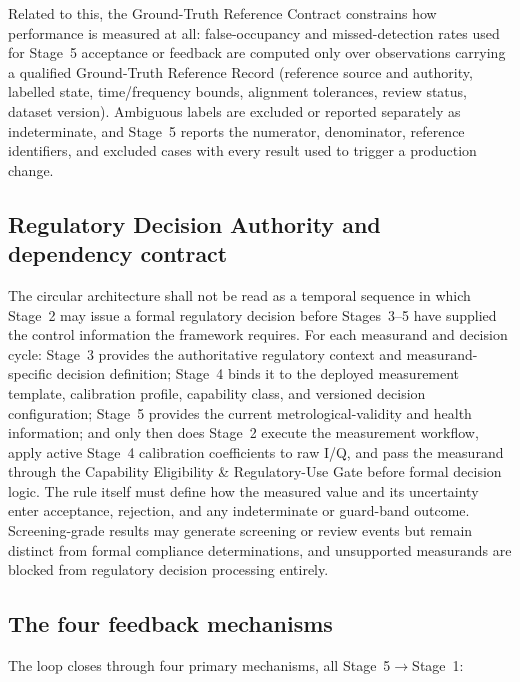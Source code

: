 \documentclass[11pt,a4paper]{article}
\begin{document}
Related to this, the Ground-Truth Reference Contract constrains how performance is measured at
all: false-occupancy and missed-detection rates used for Stage~5 acceptance or feedback are
computed only over observations carrying a qualified Ground-Truth Reference Record (reference
source and authority, labelled state, time/frequency bounds, alignment tolerances, review status,
dataset version). Ambiguous labels are excluded or reported separately as indeterminate, and
Stage~5 reports the numerator, denominator, reference identifiers, and excluded cases with every
result used to trigger a production change.

\subsection{Regulatory Decision Authority and dependency contract}
\label{sec:authority}

The circular architecture shall not be read as a temporal sequence in which Stage~2 may issue a
formal regulatory decision before Stages~3--5 have supplied the control information the framework
requires. For each measurand and decision cycle: Stage~3 provides the authoritative regulatory
context and measurand-specific decision definition; Stage~4 binds it to the deployed measurement
template, calibration profile, capability class, and versioned decision configuration; Stage~5
provides the current metrological-validity and health information; and only then does Stage~2
execute the measurement workflow, apply active Stage~4 calibration coefficients to raw I/Q, and
pass the measurand through the Capability Eligibility \& Regulatory-Use Gate before formal
decision logic. The rule itself must define how the measured value and its uncertainty enter
acceptance, rejection, and any indeterminate or guard-band outcome. Screening-grade results may
generate screening or review events but remain distinct from formal compliance determinations, and
unsupported measurands are blocked from regulatory decision processing entirely.

\subsection{The four feedback mechanisms}
\label{sec:feedback}

The loop closes through four primary mechanisms, all Stage~5$\rightarrow$Stage~1:
\end{document}
